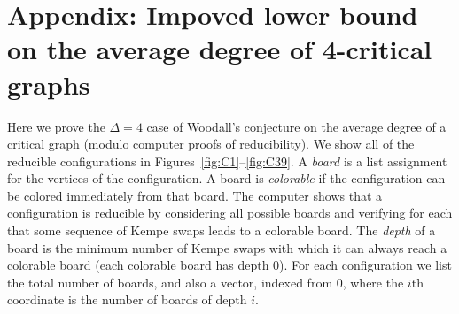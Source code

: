 \documentclass[12pt]{article}
\theoremstyle{plain}
\theoremstyle{definition}
\theoremstyle{remark}
\begin{document}
%




\section*{Appendix: Impoved lower bound on the average degree of 4-critical graphs}
Here we prove the $\Delta=4$ case of Woodall's conjecture
\cite{woodall2008average} on the average degree of a critical graph (modulo
computer proofs of reducibility).  We show all of the reducible configurations
in Figures~\ref{fig:C1}--\ref{fig:C39}.  A \emph{board} is a list assignment for
the vertices of the configuration.  A board is \emph{colorable} if the
configuration can be colored immediately from that board.  The computer shows
that a configuration is reducible by considering all possible boards and
verifying for each that some sequence of Kempe swaps leads to a colorable board.
The \emph{depth} of a board is the minimum number of Kempe swaps with which it
can always reach a colorable board (each colorable board has depth 0).
For each configuration we list the total number of boards, and also a vector,
indexed from 0, where the $i$th coordinate is the number of boards of depth $i$.
\end{document}
